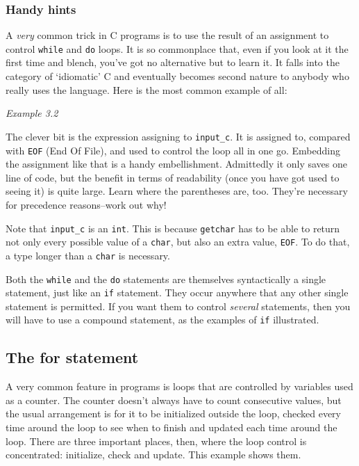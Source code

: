    \subsubsection{Handy hints}
    

    A \textit{very} common trick in C programs is to use the result of
     an assignment to control \texttt{while} and \texttt{do} loops. It
     is so commonplace that, even if you look at it the first time and blench,
     you've got no alternative but to learn it. It falls into the category of
     `idiomatic' C and eventually becomes second nature to anybody who
     really uses the language. Here is the most common example of all:


    \begin{center}\textit{Example 3.2}\end{center}


    The clever bit is the expression assigning to \texttt{input\_c}. It
     is assigned to, compared with \texttt{EOF} (End Of File), and used to
     control the loop all in one go. Embedding the assignment like that is a
     handy embellishment. Admittedly it only saves one line of code, but the
     benefit in terms of readability (once you have got used to seeing it) is
     quite large. Learn where the parentheses are, too. They're necessary for
     precedence reasons--work out why!


    Note that \texttt{input\_c} is an \texttt{int}. This is because
     \texttt{getchar} has to be able to return not only every possible
     value of a \texttt{char}, but also an extra value, \texttt{EOF}.
     To do that, a type longer than a \texttt{char} is necessary.


    Both the \texttt{while} and the \texttt{do} statements are
     themselves syntactically a single statement, just like an \texttt{if}
     statement. They occur anywhere that any other single statement is
     permitted. If you want them to control \textit{several} statements, then
     you will have to use a compound statement, as the examples of
     \texttt{if} illustrated.


   

  

  \subsection{The for statement}
   

   A very common feature in programs is loops that are controlled by
    variables used as a counter. The counter doesn't always have to count
    consecutive values, but the usual arrangement is for it to be initialized
    outside the loop, checked every time around the loop to see when to finish
    and updated each time around the loop. There are three important places,
    then, where the loop control is concentrated: initialize, check and
    update. This example shows them.


